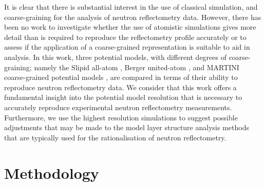 \documentclass[amsmath,amssymb,twocolumn,superscriptaddress]{revtex4-1}
\begin{document}
It is clear that there is substantial interest in the use of classical simulation, and coarse-graining for the analysis of neutron reflectometry data.
However, there has been no work to investigate whether the use of atomistic simulations gives more detail than is required to reproduce the reflectometry profile accurately or to assess if the application of a coarse-grained representation is suitable to aid in analysis.
In this work, three potential models, with different degrees of coarse-graining; namely the Slipid all-atom \cite{jambeck_derivation_2012}, Berger united-atom \cite{berger_molecular_1997}, and MARTINI coarse-grained potential models \cite{marrink_martini_2007}, are compared in terms of their ability to reproduce neutron reflectometry data.
We consider that this work offers a fundamental insight into the potential model resolution that is necessary to accurately reproduce experimental neutron reflectometry measurements.
Furthermore, we use the highest resolution simulations to suggest possible adjustments that may be made to the model layer structure analysis methods that are typically used for the rationalisation of neutron reflectometry.

\section{Methodology}
\end{document}
